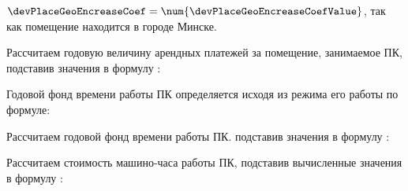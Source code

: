 \(\devPlaceGeoEncreaseCoef = \num{\devPlaceGeoEncreaseCoefValue}\), так как помещение находится в городе Минске.

Рассчитаем годовую величину арендных платежей за помещение, занимаемое ПК, подставив значения в формулу :
\devPlaceRentCostFormulaApplied

Годовой фонд времени работы ПК определяется исходя из режима его работы по формуле:
\pcWorkabilityFundEquation

Рассчитаем годовой фонд времени работы ПК. подставив значения в формулу :
\pcWorkabilityFundFormulaApplied

Рассчитаем стоимость машино-часа работы ПК, подставив вычисленные значения в формулу :
\pcPcHourCostFormulaApplied